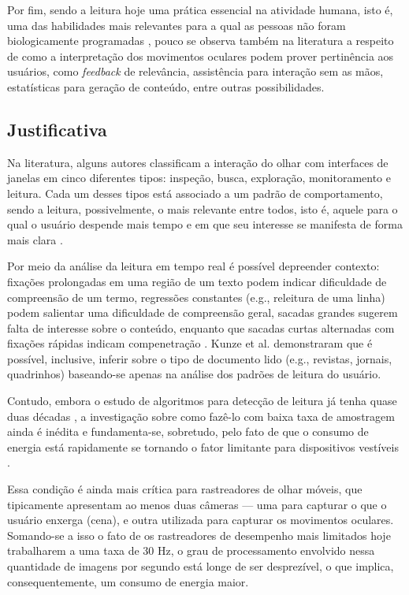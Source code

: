 \documentclass[12pt]{article}
\begin{document}
		Por fim, sendo a leitura hoje uma prática essencial na atividade humana, isto é, uma das habilidades mais relevantes para a qual as pessoas não foram biologicamente programadas \cite{Reichle-1998}, pouco se observa também na literatura a respeito de como a interpretação dos movimentos oculares podem prover pertinência aos usuários, como \textit{feedback} de relevância, assistência para interação sem as mãos, estatísticas para geração de conteúdo, entre outras possibilidades.
		
		\subsection{Justificativa}
		
		Na literatura, alguns autores classificam a interação do olhar com interfaces de janelas em cinco diferentes tipos: inspeção, busca, exploração, monitoramento e leitura. Cada um desses tipos está associado a um padrão de comportamento, sendo a leitura, possivelmente, o mais relevante entre todos, isto é, aquele para o qual o usuário despende mais tempo e em que seu interesse se manifesta de forma mais clara \cite{Campbell-2001}.
		
		Por meio da análise da leitura em tempo real é possível depreender contexto: fixações prolongadas em uma região de um texto podem indicar dificuldade de compreensão de um termo, regressões constantes (e.g., releitura de uma linha) podem salientar uma dificuldade de compreensão geral, sacadas grandes sugerem falta de interesse sobre o conteúdo, enquanto que sacadas curtas alternadas com fixações rápidas indicam compenetração \cite{Rayner-1998}. Kunze et al. \cite{Kunze-2013} demonstraram que é possível, inclusive, inferir sobre o tipo de documento lido (e.g., revistas, jornais, quadrinhos) baseando-se apenas na análise dos padrões de leitura do usuário.
		
		Contudo, embora o estudo de algoritmos para detecção de leitura já tenha quase duas décadas \cite{Campbell-2001}, a investigação sobre como fazê-lo com baixa taxa de amostragem ainda é inédita e fundamenta-se, sobretudo, pelo fato de que o consumo de energia está rapidamente se tornando o fator limitante para dispositivos vestíveis \cite{Pouwelse-2001, Starner-2001}.
		
		Essa condição é ainda mais crítica para rastreadores de olhar móveis, que tipicamente apresentam ao menos duas câmeras --- uma para capturar o que o usuário enxerga (cena), e outra utilizada para capturar os movimentos oculares. Somando-se a isso o fato de os rastreadores de desempenho mais limitados hoje trabalharem a uma taxa de 30 Hz, o grau de processamento envolvido nessa quantidade de imagens por segundo está longe de ser desprezível, o que implica, consequentemente, um consumo de energia maior.
		
\end{document}
